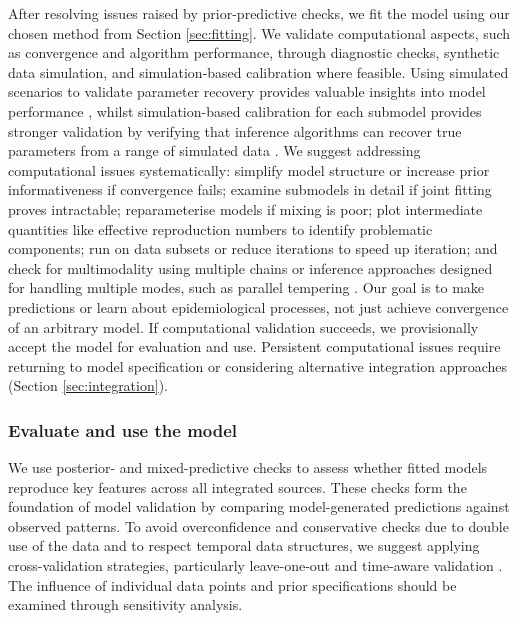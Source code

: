 \documentclass{article}
\begin{document}
After resolving issues raised by prior-predictive checks, we fit the model using our chosen method from Section \ref{sec:fitting}. We validate computational aspects, such as convergence and algorithm performance, through diagnostic checks, synthetic data simulation, and simulation-based calibration where feasible.
Using simulated scenarios to validate parameter recovery provides valuable insights into model performance \citep{bouman2024bayesian}, whilst simulation-based calibration for each submodel provides stronger validation by verifying that inference algorithms can recover true parameters from a range of simulated data \citep{talts2018validating}.
We suggest addressing computational issues systematically: simplify model structure or increase prior informativeness if convergence fails; examine submodels in detail if joint fitting proves intractable; reparameterise models if mixing is poor; plot intermediate quantities like effective reproduction numbers to identify problematic components; run on data subsets or reduce iterations to speed up iteration; and check for multimodality using multiple chains or inference approaches designed for handling multiple modes, such as parallel tempering \citep{gelman2020bayesian}.
Our goal is to make predictions or learn about epidemiological processes, not just achieve convergence of an arbitrary model. 
If computational validation succeeds, we provisionally accept the model for evaluation and use.
Persistent computational issues require returning to model specification or considering alternative integration approaches (Section \ref{sec:integration}).

\subsubsection{Evaluate and use the model}

We use posterior- and mixed-predictive checks \citep{rubin1984bayesianly,gelman1995bayesian} to assess whether fitted models reproduce key features across all integrated sources.
These checks form the foundation of model validation by comparing model-generated predictions against observed patterns.
To avoid overconfidence and conservative checks due to double use of the data and to respect temporal data structures, we suggest applying cross-validation strategies, particularly leave-one-out and time-aware validation \citep{dautel2023validation}.
The influence of individual data points and prior specifications should be examined through sensitivity analysis.
\end{document}
